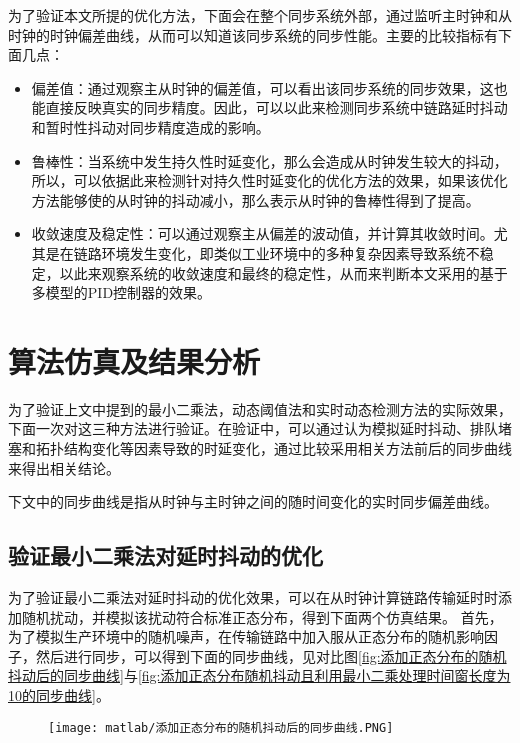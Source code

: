 为了验证本文所提的优化方法，下面会在整个同步系统外部，通过监听主时钟和从时钟的时钟偏差曲线，从而可以知道该同步系统的同步性能。主要的比较指标有下面几点：
\begin{itemize}[noitemsep,topsep=0pt,parsep=0pt,partopsep=0pt]
  \item 偏差值：通过观察主从时钟的偏差值，可以看出该同步系统的同步效果，这也能直接反映真实的同步精度。因此，可以以此来检测同步系统中链路延时抖动和暂时性抖动对同步精度造成的影响。
  \item 鲁棒性：当系统中发生持久性时延变化，那么会造成从时钟发生较大的抖动，所以，可以依据此来检测针对持久性时延变化的优化方法的效果，如果该优化方法能够使的从时钟的抖动减小，那么表示从时钟的鲁棒性得到了提高。
  \item 收敛速度及稳定性：可以通过观察主从偏差的波动值，并计算其收敛时间。尤其是在链路环境发生变化，即类似工业环境中的多种复杂因素导致系统不稳定，以此来观察系统的收敛速度和最终的稳定性，从而来判断本文采用的基于多模型的PID控制器的效果。
\end{itemize}

\section{算法仿真及结果分析}
为了验证上文中提到的最小二乘法，动态阈值法和实时动态检测方法的实际效果，下面一次对这三种方法进行验证。在验证中，可以通过认为模拟延时抖动、排队堵塞和拓扑结构变化等因素导致的时延变化，通过比较采用相关方法前后的同步曲线来得出相关结论。

下文中的同步曲线是指从时钟与主时钟之间的随时间变化的实时同步偏差曲线。

\subsection{验证最小二乘法对延时抖动的优化}
为了验证最小二乘法对延时抖动的优化效果，可以在从时钟计算链路传输延时时添加随机扰动，并模拟该扰动符合标准正态分布，得到下面两个仿真结果。
首先，为了模拟生产环境中的随机噪声，在传输链路中加入服从正态分布的随机影响因子，然后进行同步，可以得到下面的同步曲线，见对比图\ref{fig:添加正态分布的随机抖动后的同步曲线}与\ref{fig:添加正态分布随机抖动且利用最小二乘处理时间窗长度为10的同步曲线}。
\begin{figure}[!hbp]
  \centering
  \begin{minipage}[b]{1\textwidth}
    \captionstyle{\centering}
    \centering
    \texttt{[image: matlab/添加正态分布的随机抖动后的同步曲线.PNG]}
  \end{minipage}     
\end{figure}

